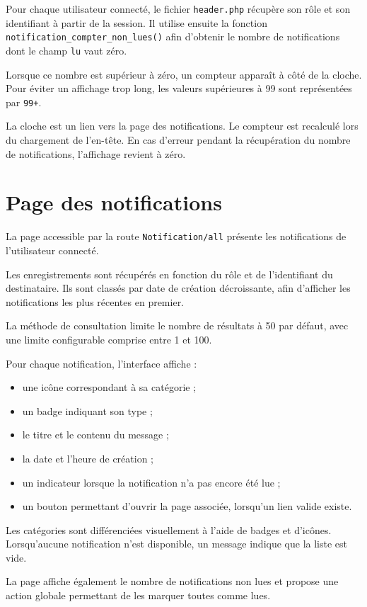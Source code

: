 Pour chaque utilisateur connecté, le fichier \texttt{header.php} récupère son rôle et son identifiant à partir de la session. Il utilise ensuite la fonction \texttt{notification\_compter\_non\_lues()} afin d'obtenir le nombre de notifications dont le champ \texttt{lu} vaut zéro.

Lorsque ce nombre est supérieur à zéro, un compteur apparaît à côté de la cloche. Pour éviter un affichage trop long, les valeurs supérieures à 99 sont représentées par \texttt{99+}.

La cloche est un lien vers la page des notifications. Le compteur est recalculé lors du chargement de l'en-tête. En cas d'erreur pendant la récupération du nombre de notifications, l'affichage revient à zéro.

\section{Page des notifications}

La page accessible par la route \texttt{Notification/all} présente les notifications de l'utilisateur connecté.

Les enregistrements sont récupérés en fonction du rôle et de l'identifiant du destinataire. Ils sont classés par date de création décroissante, afin d'afficher les notifications les plus récentes en premier.

La méthode de consultation limite le nombre de résultats à 50 par défaut, avec une limite configurable comprise entre 1 et 100.

Pour chaque notification, l'interface affiche :
\begin{itemize}
    \item une icône correspondant à sa catégorie ;
    \item un badge indiquant son type ;
    \item le titre et le contenu du message ;
    \item la date et l'heure de création ;
    \item un indicateur lorsque la notification n'a pas encore été lue ;
    \item un bouton permettant d'ouvrir la page associée, lorsqu'un lien valide existe.
\end{itemize}

Les catégories sont différenciées visuellement à l'aide de badges et d'icônes. Lorsqu'aucune notification n'est disponible, un message indique que la liste est vide.

La page affiche également le nombre de notifications non lues et propose une action globale permettant de les marquer toutes comme lues.

